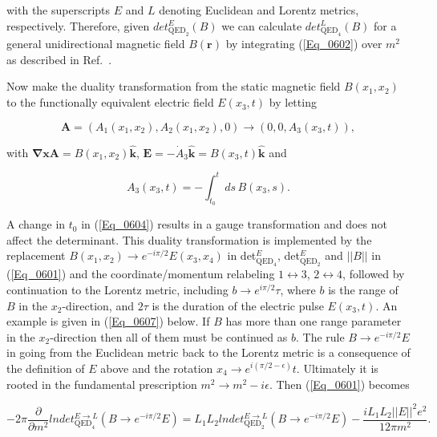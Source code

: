 \documentclass[a4paper,twocolumn,showpacs,preprintnumbers,amsmath,amssymb]{revtex4}
\newcommand{\pdo}[1]{\ensuremath{\frac{\partial }
        {\partial #1 }}}
\begin{document}
\noindent
with the superscripts $E$ and $L$ denoting Euclidean and Lorentz metrics,
respectively. Therefore, given $det^E_{\text{QED}_2}(B)$ we can
calculate $det^L_{\text{QED}_4}(B)$ for a general unidirectional
magnetic field $B(\mathbf{r})$ by integrating (\ref{Eq_0602}) over
$m^2$  as described in Ref.~\cite{Fry92}.

Now make the duality transformation from the static magnetic field
$B(x_1, x_2)$ to the functionally equivalent electric field $E(x_3,t)$
by letting

\begin{equation}
\label{Eq_0603}
\mathbf{A} = (A_1(x_1,x_2), A_2(x_1,x_2), 0) \to (0,0,A_3(x_3,t)),
\end{equation}

\noindent
with $\mathbf{\nabla x A} = B(x_1, x_2) \mathbf{\hat{k}}$,
$\mathbf{E} = -\dot{A}_3 \mathbf{\hat{k}} = B(x_3,t) \mathbf{\hat{k}}$ and

\begin{equation}
\label{Eq_0604}
A_3(x_3,t) = - \int^t_{t_0} ds \, B(x_3, s).
\end{equation}

\noindent
A change in $t_0$ in (\ref{Eq_0604}) results in a gauge transformation
and does not affect the determinant. This duality transformation is
implemented by the replacement $B(x_1,x_2) \to e^{-i\pi/2} E(x_3,x_4)$
in det$^E_{\text{QED}_4}$, det$^E_{\text{QED}_2}$ and $||B||$ in
(\ref{Eq_0601}) and the coordinate/momentum relabeling
$1 \leftrightarrow 3$, $2 \leftrightarrow 4$, followed by continuation
to the Lorentz metric, including $b \to e^{i\pi/2} \tau$, where $b$ is
the range of $B$ in the $x_2$-direction, and $2\tau$ is the duration
of the electric pulse $E(x_3,t)$. An example is given in
(\ref{Eq_0607}) below. If $B$ has more than one range parameter in the
$x_2$-direction then all of them must be continued as $b$. The rule
$B \to e^{-i\pi/2}E$ in going from the Euclidean metric back to the
Lorentz metric is a consequence of the definition of $E$ above and the
rotation $x_4 \to e^{i(\pi/2 - \epsilon)}t$. Ultimately it is rooted
in the fundamental prescription $m^2 \to m^2 - i\epsilon$. Then
(\ref{Eq_0601}) becomes

\begin{widetext}
\begin{equation}
\label{Eq_0605}
-2\pi \pdo{m^2} lndet^{E \to L}_{\text{QED}_4} (B \to e^{-i\pi/2}E)
  = L_1 L_2 lndet^{E \to L}_{\text{QED}_2} (B \to e^{-i\pi/2} E)
    - \frac{i L_1 L_2 ||E||^2 e^2}{12 \pi m^2}.
\end{equation}
\end{widetext}
\end{document}
